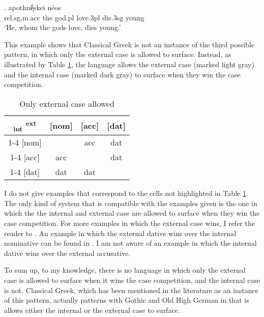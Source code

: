 \exg.     apothnḗͅskei néos\\
\ac{rel}.\ac{sg}.\ac{m}.\ac{acc} the god.\ac{pl} love.3\ac{pl}\scsub{[acc]} die.3\ac{sg}\scsub{[nom]} young\\
`He, whom the gods love, dies young.' \label{ex:ag-nom-acc}

This example shows that Classical Greek is not an instance of the third possible pattern, in which only the external case is allowed to surface. Instead, as illustrated by Table \ref{tbl:case-competition-classical-greek}, the language allows the external case (marked light gray) and the internal case (marked dark gray) to surface when they win the case competition.

\begin{table}[H]
  \center
  \caption{Only external case allowed}
  \begin{tabular}{c|c|c|c}
    \toprule
    \textsubscript{\ac{int}} \textsuperscript{\ac{ext}}
           & [\ac{nom}]
           & [\ac{acc}]
           & [\ac{dat}]
           \\ \cmidrule{1-4}
       [\ac{nom}]
           & \xcancel{\phantom{xx}}
           & \ac{acc}
           & \ac{dat}
           \\ \cmidrule{1-4}
       [\ac{acc}]
           & \cellcolor{DG}\ac{acc}
           & \xcancel{\phantom{xx}}
           & \cellcolor{LG}\ac{dat}
           \\ \cmidrule{1-4}
       [\ac{dat}]
           & \ac{dat}
           & \ac{dat}
           & \xcancel{\phantom{xx}}
           \\
     \bottomrule
  \end{tabular}
    \label{tbl:case-competition-classical-greek}
\end{table}

I do not give examples that correspond to the cells not highlighted in Table \ref{tbl:case-competition-classical-greek}. The only kind of system that is compatible with the examples given is the one in which the the internal and external case are allowed to surface when they win the case competition. For more examples in which the external case wins, I refer the reader to . An example in which the external dative wins over the internal nominative can be found in \citet{noussia2015}. I am not aware of an example in which the internal dative wins over the external accusative.

To sum up, to my knowledge, there is no language in which only the external case is allowed to surface when it wins the case competition, and the internal case is not. Classical Greek, which has been mentioned in the literature as an instance of this pattern, actually patterns with Gothic and Old High German in that is allows either the internal or the external case to surface.



